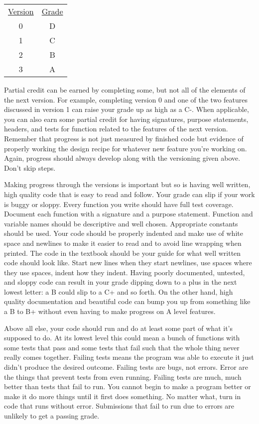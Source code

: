 \documentclass[10pt]{article}
\begin{document}
\center
\begin{tabular}{cc}
  \underline{Version} & \underline{Grade} \\
  0 & D \\
  1 & C \\
  2 & B \\
  3 & A \\
\end{tabular}


Partial credit can be earned by completing some, but not all of the elements of the next version. For example, completing version 0 and one of the two features discussed in version 1 can raise your grade up as high as a C-. When applicable, you can also earn some partial credit for having signatures, purpose statements, headers, and tests for function related to the features of the next version. Remember that progress is not just measured by finished code but evidence of properly working the design recipe for whatever new feature you're working on. Again, progress should always develop along with the versioning given above. Don't skip steps.

Making progress through the versions is important but so is having well written, high quality code that is easy to read and follow. Your grade can slip if your work is buggy or sloppy. Every function you write should have full test coverage. Document each function with a signature and a purpose statement. Function and variable names should be descriptive and well chosen. Appropriate constants should be used. Your code should be properly indented and make use of white space and newlines to make it easier to read and to avoid line wrapping when printed. The code in the textbook should be your guide for what well written code should look like. Start new lines when they start newlines, use spaces where they use spaces, indent how they indent. Having poorly documented, untested, and sloppy code can result in your grade dipping down to a plus in the next lowest letter: a B could slip to a C+ and so forth. On the other hand, high quality documentation and beautiful code can bump you up from something like a B to B+ without even having to make progress on A level features.

Above all else, your code should run and do at least some part of what it's supposed to do.  At its lowest level this could mean a bunch of functions with some tests that pass and some tests that fail such that the whole thing never really comes together. Failing tests means the program was able to execute it just didn't produce the desired outcome. Failing tests are bugs, not errors. Error are the things that prevent tests from even running. Failing tests are much, much better than tests that fail to run. You cannot begin to make a program better or make it do more things until it first does something. No matter what, turn in code that runs without error. Submissions that fail to run due to errors are unlikely to get a passing grade.
\end{document}
